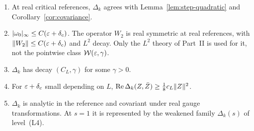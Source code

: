 \begin{proposition}\label{prop:hessian-general}
\begin{enumerate}[label=(\alph*)]
\item At real critical references, $\Delta_k$ agrees with Lemma~\ref{lem:step-quadratic} and Corollary~\ref{cor:covariance}.
\item $|\omega_0|_\infty\le C(\varepsilon+\delta_c)$. The operator $W_2$ is real symmetric at real references, with $\|W_2\|\le C(\varepsilon+\delta_c)$ and $L^2$ decay. Only the $L^2$ theory of Part~II is used for it, not the pointwise class $\mathcal W(\varepsilon,\gamma)$.
\item $\Delta_k$ has decay $(C_L,\gamma)$ for some $\gamma>0$.
\item For $\varepsilon+\delta_c$ small depending on $L$, $\operatorname{Re}\Delta_k(Z,\bar Z)\ge\frac18c_L\|Z\|^2$.
\item $\Delta_k$ is analytic in the reference and covariant under real gauge transformations. At $s=1$ it is represented by the weakened family $\Delta_k(s)$ of level~(L4).
\end{enumerate}
\end{proposition}

